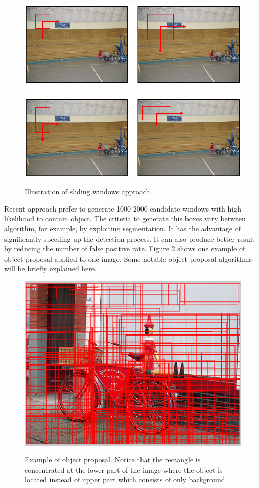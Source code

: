\documentclass[a4paper,11pt]{kth-mag}
\begin{document}
\begin{figure}[h]
\centering
\includegraphics[scale=0.5]{image/sliding_windows.png}
\label{fig:sliding_windows}
\caption{Illustration of sliding windows approach.}
\end{figure}

Recent approach prefer to generate 1000-2000 candidate windows with high likelihood to contain object. The criteria to generate this boxes vary between algorithm, for example, by exploiting segmentation. It has the advantage of significantly speeding up the detection process. It can also produce better result by reducing the number of false positive rate. Figure \ref{fig:proposal} shows one example of object proposal applied to one image. Some notable object proposal algorithms will be briefly explained here.

\begin{figure}[h]
\centering
\includegraphics[scale=0.5]{image/proposal.png}
\label{fig:proposal}
\caption{Example of object proposal. Notice that the rectangle is concentrated at the lower part of the image where the object is located instead of upper part which consists of only background.}
\end{figure}
\end{document}
